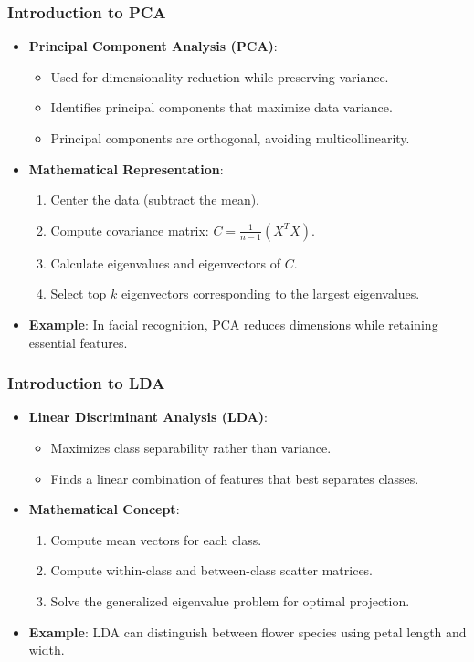 \documentclass[aspectratio=169]{beamer}
\begin{document}
\begin{frame}[fragile]
    \frametitle{Introduction to PCA}
    \begin{itemize}
        \item \textbf{Principal Component Analysis (PCA)}:
            \begin{itemize}
                \item Used for dimensionality reduction while preserving variance.
                \item Identifies principal components that maximize data variance.
                \item Principal components are orthogonal, avoiding multicollinearity.
            \end{itemize}
        \item \textbf{Mathematical Representation}:
            \begin{enumerate}
                \item Center the data (subtract the mean).
                \item Compute covariance matrix: \( C = \frac{1}{n-1} (X^TX) \).
                \item Calculate eigenvalues and eigenvectors of \( C \).
                \item Select top \( k \) eigenvectors corresponding to the largest eigenvalues.
            \end{enumerate}
        \item \textbf{Example}: In facial recognition, PCA reduces dimensions while retaining essential features.
    \end{itemize}
\end{frame}

\begin{frame}[fragile]
    \frametitle{Introduction to LDA}
    \begin{itemize}
        \item \textbf{Linear Discriminant Analysis (LDA)}:
            \begin{itemize}
                \item Maximizes class separability rather than variance.
                \item Finds a linear combination of features that best separates classes.
            \end{itemize}
        \item \textbf{Mathematical Concept}:
            \begin{enumerate}
                \item Compute mean vectors for each class.
                \item Compute within-class and between-class scatter matrices.
                \item Solve the generalized eigenvalue problem for optimal projection.
            \end{enumerate}
        \item \textbf{Example}: LDA can distinguish between flower species using petal length and width.
    \end{itemize}
\end{frame}
\end{document}
